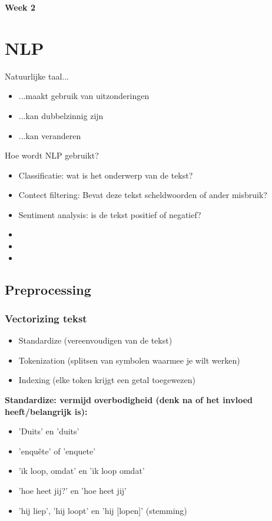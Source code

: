 {\large
\textbf{{\LARGE Week 2}}
\section{NLP}
Natuurlijke taal...
\begin{itemize}
    \item ...maakt gebruik van uitzonderingen
    \item ...kan dubbelzinnig zijn
    \item ...kan veranderen
\end{itemize}

\noindent Hoe wordt NLP gebruikt?
\begin{itemize}
    \item Classificatie: wat is het onderwerp van de tekst?
    \item Contect filtering: Bevat deze tekst scheldwoorden of ander misbruik?
    \item Sentiment analysis: is de tekst positief of negatief?
    \item
    \item
    \item 
\end{itemize}
\subsection{Preprocessing}
\subsubsection{Vectorizing tekst}
\begin{itemize}
    \item Standardize (vereenvoudigen van de tekst)
    \item Tokenization (splitsen van symbolen waarmee je wilt werken)
    \item Indexing (elke token krijgt een getal toegewezen)
\end{itemize}

\noindent \textbf{Standardize: vermijd overbodigheid (denk na of het invloed heeft/belangrijk is):}
\begin{itemize}
    \item 'Duits' en 'duits'
    \item 'enquête' of 'enquete'
    \item 'ik loop, omdat' en 'ik loop omdat'
    \item 'hoe heet jij?' en 'hoe heet jij'
    \item 'hij liep', 'hij loopt' en 'hij [lopen]' (stemming)
\end{itemize}

}
